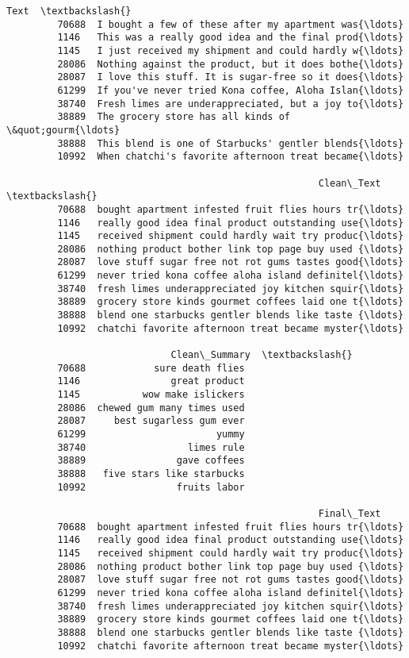 \documentclass[11pt]{article}
\begin{document}
\begin{Verbatim}[commandchars=\\\{\}]
                                                             Text  \textbackslash{}
         70688  I bought a few of these after my apartment was{\ldots}   
         1146   This was a really good idea and the final prod{\ldots}   
         1145   I just received my shipment and could hardly w{\ldots}   
         28086  Nothing against the product, but it does bothe{\ldots}   
         28087  I love this stuff. It is sugar-free so it does{\ldots}   
         61299  If you've never tried Kona coffee, Aloha Islan{\ldots}   
         38740  Fresh limes are underappreciated, but a joy to{\ldots}   
         38889  The grocery store has all kinds of \&quot;gourm{\ldots}   
         38888  This blend is one of Starbucks' gentler blends{\ldots}   
         10992  When chatchi's favorite afternoon treat became{\ldots}   
         
                                                       Clean\_Text  \textbackslash{}
         70688  bought apartment infested fruit flies hours tr{\ldots}   
         1146   really good idea final product outstanding use{\ldots}   
         1145   received shipment could hardly wait try produc{\ldots}   
         28086  nothing product bother link top page buy used {\ldots}   
         28087  love stuff sugar free not rot gums tastes good{\ldots}   
         61299  never tried kona coffee aloha island definitel{\ldots}   
         38740  fresh limes underappreciated joy kitchen squir{\ldots}   
         38889  grocery store kinds gourmet coffees laid one t{\ldots}   
         38888  blend one starbucks gentler blends like taste {\ldots}   
         10992  chatchi favorite afternoon treat became myster{\ldots}   
         
                             Clean\_Summary  \textbackslash{}
         70688            sure death flies   
         1146                great product   
         1145           wow make islickers   
         28086  chewed gum many times used   
         28087     best sugarless gum ever   
         61299                       yummy   
         38740                  limes rule   
         38889                gave coffees   
         38888   five stars like starbucks   
         10992                fruits labor   
         
                                                       Final\_Text  
         70688  bought apartment infested fruit flies hours tr{\ldots}  
         1146   really good idea final product outstanding use{\ldots}  
         1145   received shipment could hardly wait try produc{\ldots}  
         28086  nothing product bother link top page buy used {\ldots}  
         28087  love stuff sugar free not rot gums tastes good{\ldots}  
         61299  never tried kona coffee aloha island definitel{\ldots}  
         38740  fresh limes underappreciated joy kitchen squir{\ldots}  
         38889  grocery store kinds gourmet coffees laid one t{\ldots}  
         38888  blend one starbucks gentler blends like taste {\ldots}  
         10992  chatchi favorite afternoon treat became myster{\ldots}  
\end{Verbatim}
            
\end{document}
